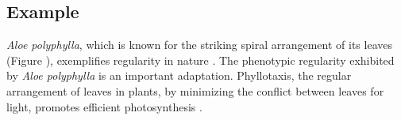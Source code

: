 \subsection{Example}
\textit{Aloe polyphylla}, which is known for the striking spiral arrangement of its leaves (Figure ), exemplifies regularity in nature \cite{RoyalHorticulturalSocietyAloePolyphylla}. The phenotypic regularity exhibited by \textit{Aloe polyphylla} is an important adaptation. Phyllotaxis, the regular arrangement of leaves in plants, by minimizing the conflict between leaves for light, promotes efficient photosynthesis \cite{Kappraff2004GrowthNumber}.
